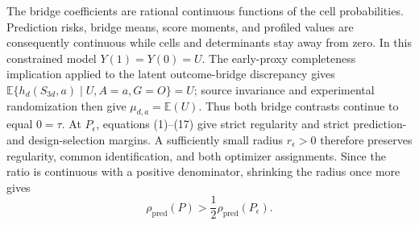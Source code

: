The bridge coefficients are rational continuous functions of the cell probabilities. Prediction risks, bridge means, score moments, and profiled values are consequently continuous while cells and determinants stay away from zero. In this constrained model \(Y(1)=Y(0)=U\). The early-proxy completeness implication applied to the latent outcome-bridge discrepancy gives \(\mathbb E\{h_d(S_{3d},a)\mid U,A=a,G=O\}=U\); source invariance and experimental randomization then give \(\mu_{d,a}=\mathbb E(U)\). Thus both bridge contrasts continue to equal \(0=\tau\). At \(P_\epsilon\), equations (1)--(17) give strict regularity and strict prediction- and design-selection margins. A sufficiently small radius \(r_\epsilon>0\) therefore preserves regularity, common identification, and both optimizer assignments. Since the ratio is continuous with a positive denominator, shrinking the radius once more gives
\[
 \rho_{\mathrm{pred}}(P)>\frac12\rho_{\mathrm{pred}}(P_\epsilon).
\]